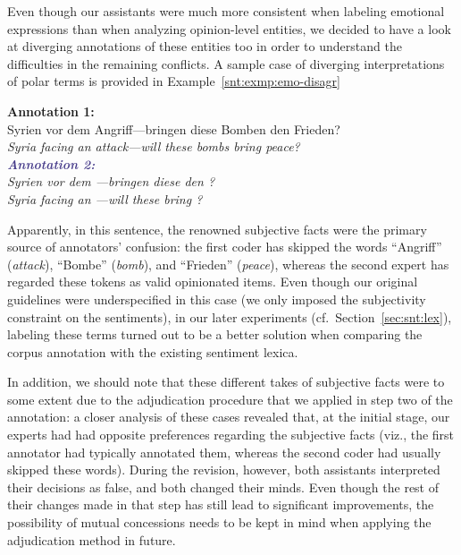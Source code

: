 Even though our assistants were much more consistent when labeling
emotional expressions than when analyzing opinion-level entities, we
decided to have a look at diverging annotations of these entities too
in order to understand the difficulties in the remaining conflicts.  A
sample case of diverging interpretations of polar terms is provided in
Example~\ref{snt:exmp:emo-disagr}

\begin{example}\label{snt:exmp:emo-disagr}
  \textcolor{red3}{\textbf{Annotation 1:}}\\ \upshape{}Syrien vor dem
  Angriff---bringen diese Bomben den Frieden?\\[0.3em]\itshape
  \noindent\itshape{}Syria facing an attack---will these bombs bring
  peace?\\

  \noindent\textcolor{darkslateblue}{\textbf{\itshape Annotation
      2:}}\\ \upshape{}Syrien vor dem
  \emoexpression{\textcolor{red}{Angriff}}---bringen diese
  \emoexpression{\textcolor{red}{Bomben}} den
  \emoexpression{\textcolor{red}{Frieden}}?\\[0.3em]
  \noindent\itshape{}Syria facing an
  \upshape{}\itshape{}---will
  these
  \upshape{}\itshape{}
  bring
  \upshape{}\itshape{}?
\end{example}

Apparently, in this sentence, the renowned subjective facts were the
primary source of annotators' confusion: the first coder has skipped
the words ``Angriff'' (\emph{attack}), ``Bombe'' (\emph{bomb}), and
``Frieden'' (\emph{peace}), whereas the second expert has regarded
these tokens as valid opinionated items.  Even though our original
guidelines were underspecified in this case (we only imposed the
subjectivity constraint on the sentiments), in our later experiments
(cf.~Section~\ref{sec:snt:lex}), labeling these terms turned out to be
a better solution when comparing the corpus annotation with the
existing sentiment lexica.

In addition, we should note that these different takes of subjective
facts were to some extent due to the adjudication procedure that we
applied in step two of the annotation: a closer analysis of these
cases revealed that, at the initial stage, our experts had had
opposite preferences regarding the subjective facts (viz., the first
annotator had typically annotated them, whereas the second coder had
usually skipped these words).  During the revision, however, both
assistants interpreted their decisions as false, and both changed
their minds.  Even though the rest of their changes made in that step
has still lead to significant improvements, the possibility of mutual
concessions needs to be kept in mind when applying the adjudication
method in future.

